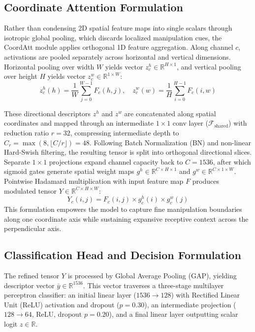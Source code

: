 \documentclass[conference]{IEEEtran}
\begin{document}
\subsection{Coordinate Attention Formulation}
Rather than condensing 2D spatial feature maps into single scalars through isotropic global pooling, which discards localized manipulation cues, the CoordAtt module applies orthogonal 1D feature aggregation. Along channel $c$, activations are pooled separately across horizontal and vertical dimensions. Horizontal pooling over width $W$ yields vector $z_c^h \in \mathbb{R}^{H \times 1}$, and vertical pooling over height $H$ yields vector $z_c^w \in \mathbb{R}^{1 \times W}$:
\begin{equation}
z_c^h(h) = \frac{1}{W} \sum_{j=0}^{W-1} F_c(h, j), \quad z_c^w(w) = \frac{1}{H} \sum_{i=0}^{H-1} F_c(i, w)
\end{equation}

These directional descriptors $z^h$ and $z^w$ are concatenated along spatial coordinates and mapped through an intermediate $1 \times 1$ conv layer ($\mathcal{F}_{\text{shared}}$) with reduction ratio $r = 32$, compressing intermediate depth to $C_r = \max(8, \lfloor C/r \rfloor) = 48$. Following Batch Normalization (BN) and non-linear Hard-Swish filtering, the resulting tensor is split into orthogonal directional slices. Separate $1 \times 1$ projections expand channel capacity back to $C = 1536$, after which sigmoid gates generate spatial weight maps $g^h \in \mathbb{R}^{C \times H \times 1}$ and $g^w \in \mathbb{R}^{C \times 1 \times W}$. Pointwise Hadamard multiplication with input feature map $F$ produces modulated tensor $Y \in \mathbb{R}^{C \times H \times W}$:
\begin{equation}
Y_c(i, j) = F_c(i, j) \times g_c^h(i) \times g_c^w(j)
\end{equation}
This formulation empowers the model to capture fine manipulation boundaries along one coordinate axis while sustaining expansive receptive context across the perpendicular axis.

\subsection{Classification Head and Decision Formulation}
The refined tensor $Y$ is processed by Global Average Pooling (GAP), yielding descriptor vector $\bar{y} \in \mathbb{R}^{1536}$. This vector traverses a three-stage multilayer perceptron classifier: an initial linear layer ($1536 \to 128$) with Rectified Linear Unit (ReLU) activation and dropout ($p = 0.30$), an intermediate projection ($128 \to 64$, ReLU, dropout $p = 0.20$), and a final linear layer outputting scalar logit $z \in \mathbb{R}$.
\end{document}

